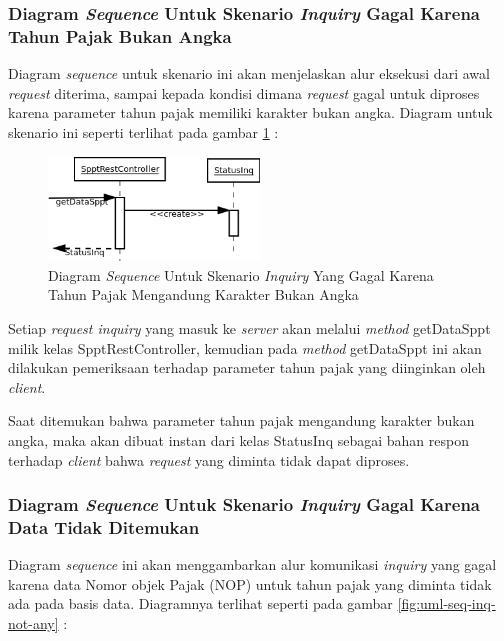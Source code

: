 \documentclass[pdftex,12pt, oneside]{article}
\begin{document}
\subsubsection{Diagram \textit{Sequence} Untuk Skenario \textit{Inquiry} Gagal Karena Tahun Pajak Bukan Angka}

Diagram \textit{sequence} untuk skenario ini akan menjelaskan alur eksekusi dari awal \textit{request} diterima, sampai kepada kondisi dimana \textit{request} gagal untuk diproses karena parameter tahun pajak memiliki karakter bukan angka. Diagram untuk skenario ini seperti terlihat pada gambar \ref{fig:uml-seq-inq-thn-not-valid} :

\begin{figure}[H]
  \centering
  \includegraphics[width=0.5\textwidth]{./resources/uml/uml-seq-inq-thn-not-valid}
  \caption{Diagram \textit{Sequence} Untuk Skenario \textit{Inquiry} Yang Gagal Karena Tahun Pajak Mengandung Karakter Bukan Angka}
  \label{fig:uml-seq-inq-thn-not-valid}
\end{figure}

Setiap \textit{request inquiry} yang masuk ke \textit{server} akan melalui \textit{method} getDataSppt milik kelas SpptRestController, kemudian pada \textit{method} getDataSppt ini akan dilakukan pemeriksaan terhadap parameter tahun pajak yang diinginkan oleh \textit{client}.

Saat ditemukan bahwa parameter tahun pajak mengandung karakter bukan angka, maka akan dibuat instan dari kelas StatusInq sebagai bahan respon terhadap \textit{client} bahwa \textit{request} yang diminta tidak dapat diproses.

\subsubsection{Diagram \textit{Sequence} Untuk Skenario \textit{Inquiry} Gagal Karena Data Tidak Ditemukan}

Diagram \textit{sequence} ini akan menggambarkan alur komunikasi \textit{inquiry} yang gagal karena data Nomor objek Pajak (NOP) untuk tahun pajak yang diminta tidak ada pada basis data. Diagramnya terlihat seperti pada gambar \ref{fig:uml-seq-inq-not-any} :
\end{document}
